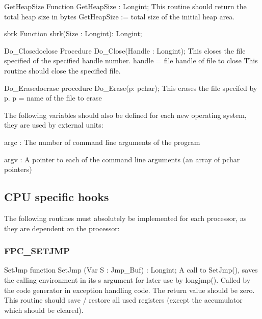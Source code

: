 \documentclass [a4paper,12pt]{article}
\begin{document}
\begin{function}{GetHeapSize}
\Declaration
Function GetHeapSize : Longint;
\Description
This routine should return the total heap size in bytes
\Parameters
\Algorithm
GetHeapSize := total size of the initial heap area.
\end{function}

\begin{function}{sbrk}
\Declaration
Function sbrk(Size : Longint): Longint;
\Description
\end{function}

\begin{procedurel}{Do{\_}Close}{doclose}
\Declaration
Procedure Do{\_}Close(Handle : Longint);
\Description
This closes the file specified of the specified handle number.
\Parameters
handle = file handle of file to close
\Notes
This routine should close the specified file.
\end{procedurel}

\begin{functionl}{Do{\_}Erase}{doerase}
\Declaration
procedure Do{\_}Erase(p: pchar);
\Description
This erases the file specifed by p.
\Parameters
p = name of the file to erase
\Notes
\end{functionl}

The following variables should also be defined for each new operating
system, they are used by external units:

\noindent
argc : The number of command line arguments of the program

\noindent
argv : A pointer to each of the command line arguments (an array of pchar
pointers)

\subsection{CPU specific hooks}
\label{subsec:mylabel9}

The following routines must absolutely be implemented for each processor, as
they are dependent on the processor:

\subsubsection{FPC{\_}SETJMP}
\label{subsubsec:mylabel30}

\begin{function}{SetJmp}
\Declaration
function SetJmp (Var S : Jmp{\_}Buf) : Longint;
\Description
A call to SetJmp(), saves the calling environment in its \textsf{s} argument
for later use by \textsf{longjmp()}. Called by the code generator in
exception handling code. The return value should be zero.
\Notes
This routine should save / restore all used registers (except the
accumulator which should be cleared).
\end{function}
\end{document}
